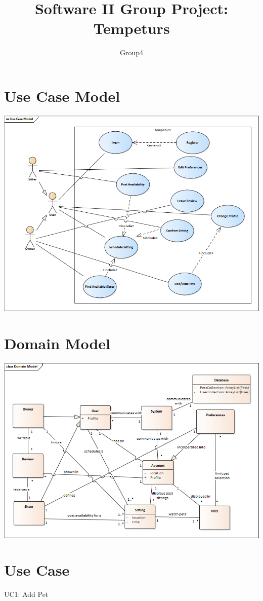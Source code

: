 \documentclass[12pt]{article}
\title{Software II Group Project: Tempeturs}
\author{Group4}
\begin{document}
\maketitle 
\thispagestyle{empty}


\section*{Use Case Model}
\includegraphics[scale=.6]{Use_Case_Model}


\section*{Domain Model}
\includegraphics[scale=.65]{Domain_Model}
\section*{Use Case}
UC1: Add Pet\newline 
\end{document}
